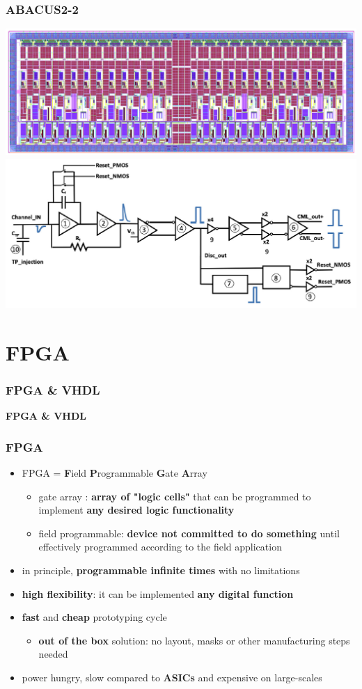 \documentclass[aspectratio=169]{beamer}
\begin{document}
	
	\begin{frame}
	\frametitle{ABACUS2-2}
	\begin{center}
		\includegraphics[width=0.6 \textwidth]{IMG/ABACUS.PNG}
		\includegraphics[width=0.6 \textwidth]{IMG/ABACUS_channel.PNG}
	\end{center}
	\end{frame}

	\section{FPGA}
	
		
	\begin{frame}
	\frametitle{FPGA \& VHDL}
	\begin{center}
		{\Huge {}\selectfont \color{blue} \textbf{FPGA \& VHDL}}
	\end{center}
	\end{frame}
	
	\begin{frame}
	\frametitle{FPGA}
	{\Large 
		\begin{itemize}
			\item FPGA = \textbf{F}ield \textbf{P}rogrammable \textbf{G}ate \textbf{A}rray
			\begin{itemize}
				\item gate array : \textbf{array of "logic cells"} that can be programmed to implement \textbf{any desired logic functionality}
				\item field programmable: \textbf{device not committed to do something} until effectively programmed according to the field application
			\end{itemize}
		\item in principle, \textbf{programmable infinite times} with no limitations
		\item \textbf{high flexibility}: it can be implemented \textbf{any digital function}
		\item \textbf{fast} and \textbf{cheap} prototyping cycle
		\begin{itemize}
			\item \textbf{out of the box} solution: no layout, masks or other manufacturing steps needed
		\end{itemize}
		\item {\color{orange} power hungry, slow compared to \textbf{ASICs} and expensive on large-scales}
		\end{itemize}
	}
	\end{frame}
\end{document}
